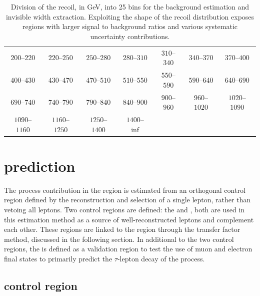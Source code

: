 \begin{table}[htb]
    \centering
    \begin{tabular}{ccccccc}
        $200$--$220$ & $220$--$250$ & $250$--$280$ & $280$--$310$ & $310$--$340$ & $340$--$370$ & $370$--$400$ \\
        $400$--$430$ & $430$--$470$ & $470$--$510$ & $510$--$550$ & $550$--$590$ & $590$--$640$ & $640$--$690$ \\
        $690$--$740$ & $740$--$790$ & $790$--$840$ & $840$--$900$ & $900$--$960$ & $960$--$1020$ & $1020$--$1090$ \\
        $1090$--$1160$ & $1160$--$1250$ & $1250$--$1400$ & $1400$--$\inf$
    \end{tabular}
    \caption[Recoil bins.]{
        Division of the recoil, in GeV, into 25 bins for the background estimation and \PZ invisible width extraction. Exploiting the shape of the recoil distribution exposes regions with larger signal to background ratios and various systematic uncertainty contributions.
    }
    \label{tab:met-bins}
\end{table}

\section{\IWlv prediction}\label{sec:wjets-prediction}

The \IWlv process contribution in the \metplusjets region is estimated from an
orthogonal control region defined by the reconstruction and selection of a
single lepton, rather than vetoing all leptons. Two control regions are
defined: the \muplusjets and \eleplusjets, both are used in this estimation
method as a source of well-reconstructed leptons and complement each other. 
These regions are linked to the \metplusjets region through the
transfer factor method, discussed in the following section. In additional to
the two control regions, the \tauplusjets is defined as a validation region to
test the use of muon and electron final states to primarily predict the
$\tau$-lepton decay of the \IWlv process.


\subsection{\muplusjets control region}

